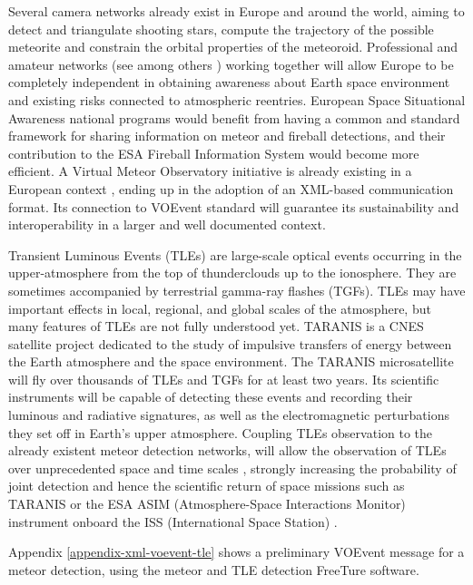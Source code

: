 \documentclass[referee,a4paper,12pt,traditabstract]{swsc}
\begin{document}
\begin{linenumbers}
Several camera networks already exist in Europe and around the world, aiming to detect and triangulate shooting stars, compute the trajectory of the possible meteorite and constrain the orbital properties of the meteoroid. Professional and amateur networks (see among others \cite{1998M&PS...33...49O, 2015EPSC...10..800C, 2016pimo.conf...76G, 2013pimo.conf..125J}) working together will allow Europe to be completely independent in obtaining awareness about Earth space environment and existing risks connected to atmospheric reentries. European Space Situational Awareness national programs would benefit from having a common and standard framework for sharing information on meteor and fireball detections, and their contribution to the ESA Fireball Information System would become more efficient. A Virtual Meteor Observatory initiative is already existing in a European context \cite{2008EM&P..102..247K, 2010JIMO...38...10B}, ending up in the adoption of an XML-based communication format. Its connection to VOEvent standard will guarantee its sustainability and interoperability in a larger and well documented context.

Transient Luminous Events (TLEs) are large-scale optical events occurring in the upper-atmosphere from the top of thunderclouds up to the ionosphere. They are sometimes accompanied by terrestrial gamma-ray flashes (TGFs). TLEs may have important effects in local, regional, and global scales of the atmosphere, but many features of TLEs are not fully understood yet. TARANIS is a CNES satellite project dedicated to the study of impulsive transfers of energy between the Earth atmosphere and the space environment. The TARANIS microsatellite will fly over thousands of TLEs and TGFs for at least two years. Its scientific instruments will be capable of detecting these events and recording their luminous and radiative signatures, as well as the electromagnetic perturbations they set off in Earth's upper atmosphere. Coupling TLEs observation to the already existent meteor detection networks, will allow the observation of TLEs over unprecedented space and time scales \cite{2017AGUFMAE23A2469G}, strongly increasing the probability of joint detection and hence the scientific return of space missions such as TARANIS or the ESA ASIM (Atmosphere-Space Interactions Monitor) instrument onboard the ISS (International Space Station) \cite{2009AIPC.1118....8N}.

Appendix \ref{appendix-xml-voevent-tle} shows a preliminary VOEvent message for a meteor detection, using the meteor and TLE detection FreeTure \cite{2014pim4.conf...39A} software. 


\end{linenumbers}
\end{document}
